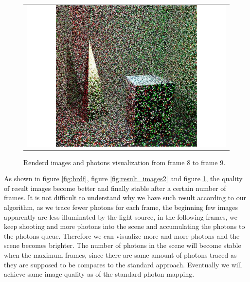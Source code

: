 \begin{figure}
\begin{center}
{\begin{tabular}{c}
\includegraphics*[scale=0.25]{imgs/pqv_frame9.pdf}
\end{tabular}
}%
\caption{Renderd images and photons visualization from frame 8 to frame 9.}
\end{center}
\label{fig:result_images3}
\end{figure}

As shown in figure \ref{fig:brdf}, figure \ref{fig:result_images2} and figure \ref{fig:result_images3}, the quality of 	result images become better and finally stable after a certain number of frames. It is not difficult to understand why we have such result according to our algorithm, as we trace fewer photons for each frame, the beginning few images apparently are less illuminated by the light source, in the following frames, we keep shooting and more photons into the scene and accumulating the photons to the photons queue. Therefore we can visualize more and more photons and the scene becomes brighter. The number of photons in the scene will become stable when the maximum frames, since there are same amount of photons traced as they are supposed to be compares to the standard approach. Eventually we will achieve same image quality as of the standard photon mapping. 



